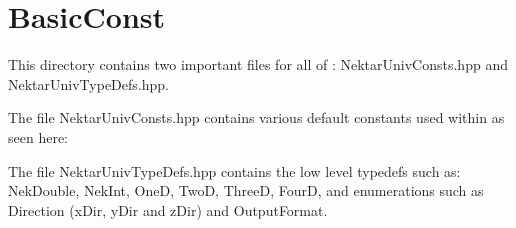 %
\section{BasicConst}

This directory contains two important files for all of {\nek}:  NektarUnivConsts.hpp and NektarUnivTypeDefs.hpp.

The file NektarUnivConsts.hpp contains various default constants used within {\nek} as seen here:



The file NektarUnivTypeDefs.hpp contains the low level typedefs such as:  NekDouble, NekInt, OneD, TwoD, ThreeD, FourD, and
enumerations such as Direction (xDir, yDir and zDir) and OutputFormat. 
